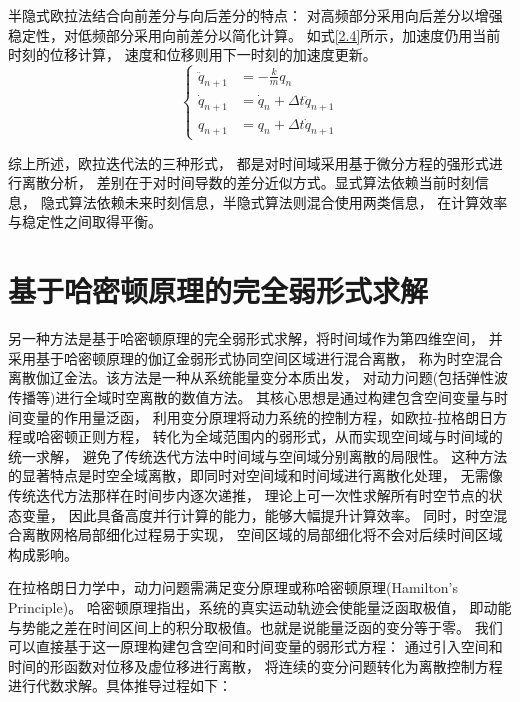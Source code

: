 半隐式欧拉法结合向前差分与向后差分的特点：
对高频部分采用向后差分以增强稳定性，对低频部分采用向前差分以简化计算。
如式\ref{2.4}所示，加速度仍用当前时刻的位移计算，
速度和位移则用下一时刻的加速度更新。
\begin{equation}\label{2.4}
\left \{
\begin{split}
\ddot q_{n+1} &= - \frac{k}{m} q_n \\
\dot q_{n+1} &= \dot q_n + \Delta t \ddot q_{n+1} \\
q_{n+1} &= q_n + \Delta t \dot q_{n+1}
\end{split}
\right . 
\end{equation}


综上所述，欧拉迭代法的三种形式，
都是对时间域采用基于微分方程的强形式进行离散分析，
差别在于对时间导数的差分近似方式。显式算法依赖当前时刻信息，
隐式算法依赖未来时刻信息，半隐式算法则混合使用两类信息，
在计算效率与稳定性之间取得平衡。

\section{基于哈密顿原理的完全弱形式求解}

另一种方法是基于哈密顿原理的完全弱形式求解，将时间域作为第四维空间，
并采用基于哈密顿原理的伽辽金弱形式协同空间区域进行混合离散，
称为时空混合离散伽辽金法。该方法是一种从系统能量变分本质出发，
对动力问题(包括弹性波传播等)进行全域时空离散的数值方法。
其核心思想是通过构建包含空间变量与时间变量的作用量泛函，
利用变分原理将动力系统的控制方程，如欧拉-拉格朗日方程或哈密顿正则方程，
转化为全域范围内的弱形式，从而实现空间域与时间域的统一求解，
避免了传统迭代方法中时间域与空间域分别离散的局限性。
这种方法的显著特点是时空全域离散，即同时对空间域和时间域进行离散化处理，
无需像传统迭代方法那样在时间步内逐次递推，
理论上可一次性求解所有时空节点的状态变量，
因此具备高度并行计算的能力，能够大幅提升计算效率。
同时，时空混合离散网格局部细化过程易于实现，
空间区域的局部细化将不会对后续时间区域构成影响。

在拉格朗日力学中，动力问题需满足变分原理或称哈密顿原理(Hamilton’s Principle)。
哈密顿原理指出，系统的真实运动轨迹会使能量泛函取极值，
即动能与势能之差在时间区间上的积分取极值。也就是说能量泛函的变分等于零。
我们可以直接基于这一原理构建包含空间和时间变量的弱形式方程：
通过引入空间和时间的形函数对位移及虚位移进行离散，
将连续的变分问题转化为离散控制方程进行代数求解。具体推导过程如下：

